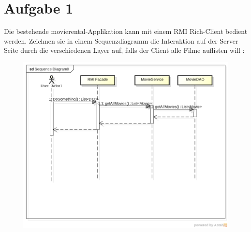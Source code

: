\documentclass[a4paper,10pt]{scrreprt}
\begin{document}
\section*{Aufgabe 1}
Die bestehende movierental-Applikation kann mit einem RMI Rich-Client bedient werden. Zeichnen
sie in einem Sequenzdiagramm die Interaktion auf der Server Seite durch die verschiedenen Layer
auf, falls der Client alle Filme auflisten will :
\begin{figure}[h]
 \centering
 \includegraphics[scale=0.6]{./archan1.png}
\end{figure}
\pagebreak
\end{document}
